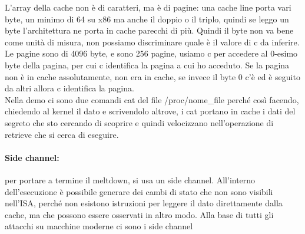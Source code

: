 \documentclass[14pt, oneside]{book}
\begin{document}
L'array della cache non è di caratteri, ma è di pagine: una cache line porta vari byte, un minimo di 64 su x86 ma anche il doppio o il triplo, quindi se leggo un byte l'architettura ne porta in cache parecchi di più. Quindi il byte non va bene come unità di misura, non possiamo discriminare quale è il valore di c da inferire.\\ Le pagine sono di 4096 byte, e sono 256 pagine, usiamo c per accedere al 0-esimo byte della pagina, per cui c identifica la pagina a cui ho acceduto. Se la pagina non è in cache assolutamente, non era in cache, se invece il byte 0 c'è ed è seguito da altri allora c identifica la pagina.\\ Nella demo ci sono due comandi cat del file /proc/nome\_file perché così facendo, chiedendo al kernel il dato e scrivendolo altrove, i cat portano in cache i dati del segreto che sto cercando di scoprire e quindi velocizzano nell'operazione di retrieve che si cerca di eseguire.
\paragraph{Side channel:}per portare a termine il meltdown, si usa un side channel. All'interno dell'esecuzione è possibile generare dei cambi di stato che non sono visibili nell'ISA, perché non esistono istruzioni per leggere il dato direttamente dalla cache, ma che possono essere osservati in altro modo. Alla base di tutti gli attacchi su macchine moderne ci sono i side channel
\end{document}
